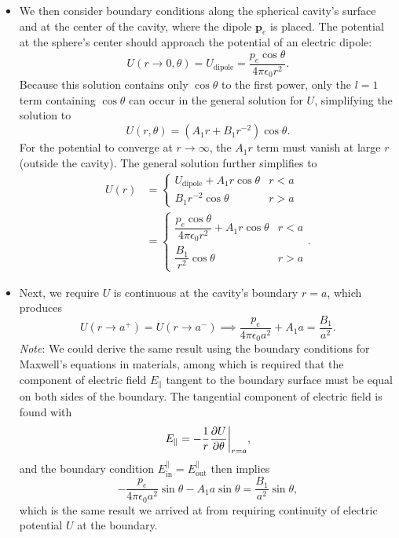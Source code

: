 \documentclass[11pt, a4paper]{article}
\renewcommand{\vec}[1]{\bm{#1}} %
\newcommand{\ee}{\epsilon_{0}}  %
\newcommand{\pe}{\vec{p}_{e}}  %
\begin{document}
\begin{itemize}
	\item We then consider boundary conditions along the spherical cavity's surface and at the center of the cavity, where the dipole $ \pe $ is placed. The potential at the sphere's center should approach the potential of an electric dipole:
	\begin{equation*}
		U(r \to 0, \theta) = U_{\mathrm{dipole}} = \frac{p_{e}\cos \theta}{4 \pi \ee r^{2}}.
	\end{equation*}
	Because this solution contains only $ \cos \theta $ to the first power, only the $ l = 1 $ term containing $ \cos \theta $ can occur in the general solution for $ U $, simplifying the solution to
	\begin{equation*}
		U(r, \theta) = (A_{1}r + B_{1}r^{-2})\cos \theta.
	\end{equation*}
	For the potential to converge at $  r \to \infty $, the $ A_{1}r $ term must vanish at large $ r $ (outside the cavity). The general solution further simplifies to
	\begin{align*}
		U(r) &= 
		\begin{cases}
			U_{\text{dipole}} + A_{1}r \cos \theta & r < a\\
			B_{1}r^{-2} \cos \theta & r > a
		\end{cases}\\
		& = 
		\begin{cases}
			\dfrac{p_{e}\cos \theta}{4 \pi \ee r^{2}} + A_{1}r \cos \theta & r < a\\[2mm]
			\dfrac{B_{1}}{r^{2}}\cos \theta & r > a
		\end{cases}.
	\end{align*}
	
	\item Next, we require $ U $ is continuous at the cavity's boundary $ r = a $, which produces
	\begin{equation*}
		U(r \to a^{+}) = U(r \to a^{-}) \implies \frac{p_{e}}{4\pi \ee a^{2}} + A_{1}a = \frac{B_{1}}{a^{2}}.
	\end{equation*}
	\textit{Note}: We could derive the same result using the boundary conditions for Maxwell's equations in materials, among which is required that the component of electric field $ E_{\parallel} $ tangent to the boundary surface must be equal on both sides of the boundary. The tangential component of electric field is found with
	\begin{equation*}
		E_{\parallel} = -\frac{1}{r}\pdv{U}{\theta}\bigg |_{r=a},
	\end{equation*}
	and the boundary condition $ E_{\text{in}}^{\parallel} = E_{\text{out}}^{\parallel}  $ then implies 
	\begin{equation*}
		- \frac{p_{e}}{4\pi \ee a^{2}} \sin \theta - A_{1} a \sin \theta = \frac{B_{1}}{a^{2}} \sin \theta,
	\end{equation*}
	which is the same result we arrived at from requiring continuity of electric potential $ U $ at the boundary. 
	

\end{itemize}
\end{document}
